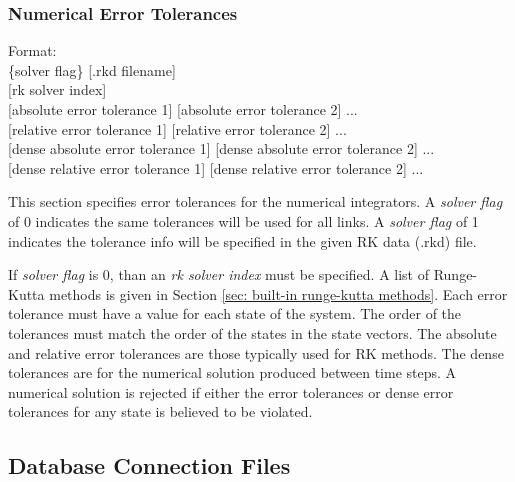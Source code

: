 \documentclass[12pt]{article}
\newenvironment{codeindent}
{\begin{list}{}
        {\setlength{\leftmargin}{.1in}}
        \item[]
}
{\end{list}}
\begin{document}
\subsubsection{Numerical Error Tolerances} \label{sec: numerical error tolerances}

\begin{codeindent}
Format: \\
\{solver flag\} [.rkd filename] \\
{[}rk solver index{]} \\
{[}absolute error tolerance 1{]} {[}absolute error tolerance 2{]} ... \\
{[}relative error tolerance 1{]} {[}relative error tolerance 2{]} ... \\
{[}dense absolute error tolerance 1{]} {[}dense absolute error tolerance 2{]} ... \\
{[}dense relative error tolerance 1{]} {[}dense relative error tolerance 2{]} ...
\end{codeindent}

This section specifies error tolerances for the numerical integrators. A \textit{solver flag} of 0 indicates the same tolerances will be used for all links. A \textit{solver flag} of 1 indicates the tolerance info will be specified in the given RK data (.rkd) file.

If \textit{solver flag} is 0, than an \textit{rk solver index} must be specified. A list of Runge-Kutta methods is given in Section \ref{sec: built-in runge-kutta methods}. Each error tolerance must have a value for each state of the system. The order of the tolerances must match the order of the states in the state vectors. The absolute and relative error tolerances are those typically used for RK methods. The dense tolerances are for the numerical solution produced between time steps. A numerical solution is rejected if either the error tolerances or dense error tolerances for any state is believed to be violated.


\subsection{Database Connection Files} \label{sec: database connection files}
\end{document}
